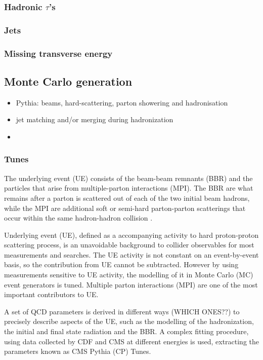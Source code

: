 \documentclass[11pt]{article}
\begin{document}
\subsubsection{Hadronic \(\tau\)'s}
\label{sec:orgda7b0bb}
\subsubsection{Jets}
\label{sec:org5c172d2}
\subsubsection{Missing transverse energy}
\label{sec:orge2bcd84}
\subsection{Monte Carlo generation}
\label{sec:org5ac9224}
\begin{itemize}
\item Pythia: beams, hard-scattering, parton showering and hadronisation
\item jet matching and/or merging during hadronization
\item 
\end{itemize}

\subsubsection{Tunes}
\label{sec:org1da35fa}
The underlying event (UE) consists of the beam-beam remnants (BBR) and the particles that arise from multiple-parton interactions (MPI).
The BBR are what remains after a parton is scattered out of each of the two initial beam hadrons, while the MPI are additional soft or semi-hard parton-parton scatterings that occur within the same hadron-hadron collision \cite{CMS_Tunes}.

Underlying event (UE), defined as a accompanying activity to hard proton-proton scattering process,
is an unavoidable background to collider observables for most measurements and searches. The UE
activity is not constant on an event-by-event basis, so the contribution from UE cannot be subtracted.
However by using measurements sensitive to UE activity, the modelling of it in Monte Carlo (MC) event
generators is tuned. Multiple parton interactions (MPI) are one of the most important contributors to UE. \cite{hllhc_physics}

A set of QCD parameters is derived in different ways (WHICH ONES??) to precisely describe aspects of the UE, such as the modelling of the hadronization, the initial and final state radiation and the BBR.
A complex fitting procedure, using data collected by CDF and CMS at different energies is used, extracting the parameters known as CMS Pythia (CP) Tunes.
\end{document}
